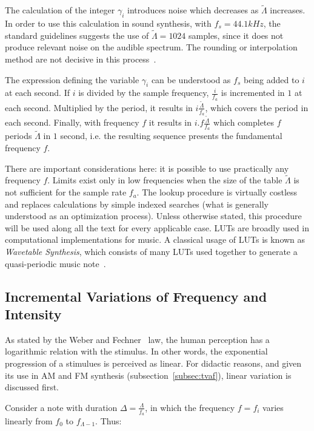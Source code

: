 \documentclass[
 aip,
 jmp,
 amsmath,amssymb,
 reprint,
]{revtex4-1}
\begin{document}
The calculation of the integer $\gamma_i$ introduces noise which decreases as $\widetilde{\Lambda}$ increases.
In order to use this calculation in sound synthesis, with $f_s=44.1 kHz$, the standard guidelines suggests the use of $\widetilde{\Lambda} = 1024$ samples, since it does not produce relevant noise on the audible spectrum. The rounding or interpolation method are not decisive in this process~\cite{Geiger}.

The expression defining the variable $\gamma_i$ can be understood as $f_s$ being added to $i$ at each second.
If $i$ is divided by the sample frequency, $\frac{i}{f_a}$
is incremented in $1$ at each second. Multiplied by the period, it results in $i \frac{\widetilde{\Lambda}}{f_a}$, which covers the period in each second. Finally, with frequency $f$ it results in $i . f \frac{\widetilde{\Lambda}}{f_a}$ which completes $f$ periods $\widetilde{\Lambda}$ in $1$ second, i.e. the resulting sequence presents the fundamental frequency $f$.

There are important considerations here: it is possible to use practically any frequency $f$. Limits exist only in low frequencies when the size of the table  $\widetilde{\Lambda}$ is not sufficient for the sample rate $f_a$. The lookup procedure is virtually costless and replaces calculations by simple indexed searches (what is generally understood as an optimization process). Unless otherwise stated, this procedure will be used along all the text for every applicable case.
LUTs are broadly used in computational implementations for music. A classical usage of LUTs is known as \emph{Wavetable Synthesis}, which consists of many LUTs used together to generate a quasi-periodic music note~\cite{Cook,Wavetable}.

\subsection{Incremental Variations of Frequency and Intensity}\label{subsec:vars}

As stated by the Weber and Fechner~\cite{Weber-Fechner} law, the human perception has a logarithmic relation with the stimulus. In other words, the exponential progression of a stimulues is perceived as linear.
For didactic reasons, and given its use in AM and FM synthesis (subsection~\ref{subsec:tvaf}), linear variation is discussed first.

Consider a note with duration $\Delta = \frac{\Lambda}{f_a}$, in which the frequency $f=f_i$ varies linearly from $f_0$ to $f_{\Lambda -1}$. Thus:
\end{document}
